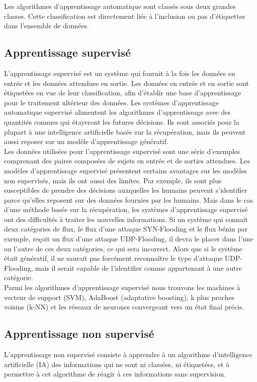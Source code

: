 \noindent Les algorithmes d’apprentissage automatique sont classés sous deux grandes classes. Cette classification est directement liée à l’inclusion ou pas d’étiquettes dans l’ensemble de données.

\subsection{Apprentissage supervisé}
L’apprentissage supervisé est un système qui fournit à la fois les données en entrée et les données attendues en sortie. Les données en entrée et en sortie sont étiquetées en vue de leur classification, afin d'établir une base d'apprentissage pour le traitement ultérieur des données. Les systèmes d'apprentissage automatique supervisé alimentent les algorithmes d'apprentissage avec des quantités connues qui étayeront les futures décisions. Ils sont associés pour la plupart à une intelligence artificielle basée sur la récupération, mais ils peuvent aussi reposer sur un modèle d'apprentissage génératif.\\

\noindent Les données utilisées pour l'apprentissage supervisé sont une série d'exemples comprenant des paires composées de sujets en entrée et de sorties attendues. Les modèles d'apprentissage supervisé présentent certains avantages sur les modèles non supervisés, mais ils ont aussi des limites. Par exemple, ils sont plus susceptibles de prendre des décisions auxquelles les humains peuvent s'identifier parce qu'elles reposent sur des données fournies par les humains. Mais dans le cas d'une méthode basée sur la récupération, les systèmes d'apprentissage supervisé ont des difficultés à traiter les nouvelles informations. Si un système qui connaît deux catégories de flux, le flux d’une attaque SYN-Flooding et le flux bénin par exemple, reçoit un flux d’une attaque UDP-Flooding, il devra le placer dans l'une ou l'autre de ces deux catégories, ce qui sera incorrect. Alors que si le système était génératif, il ne saurait pas forcément reconnaître le type d’attaque UDP-Flooding, mais il serait capable de l'identifier comme appartenant à une autre catégorie. \\

\noindent Parmi les algorithmes d’apprentissage supervisé nous trouvons les machines à vecteur de support (SVM),  AdaBoost (adaptative boosting), k plus proches voisins (k-NN) et les réseaux de neurones convergeant vers un état final précis.

\subsection{Apprentissage non supervisé}
L’apprentissage non supervisé consiste à apprendre à un algorithme d'intelligence artificielle (IA) des informations qui ne sont ni classées, ni étiquetées, et à permettre à cet algorithme de réagir à ces informations sans supervision.\\

